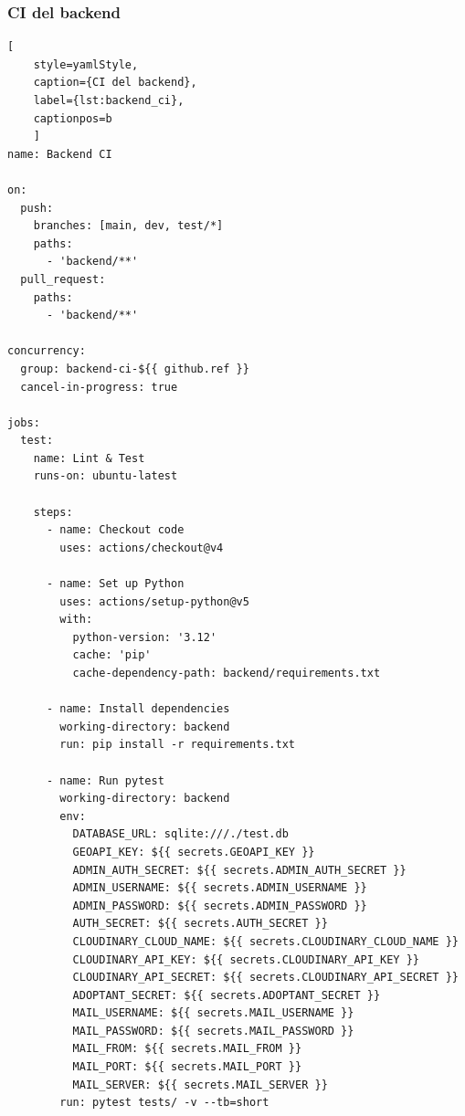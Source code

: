\documentclass[11pt,a4paper]{report}
\begin{document}
\subsubsection{CI del backend}
\begin{lstlisting}[
    style=yamlStyle,
    caption={CI del backend},
    label={lst:backend_ci},
    captionpos=b
    ]
name: Backend CI

on:
  push:
    branches: [main, dev, test/*]
    paths:
      - 'backend/**'
  pull_request:
    paths:
      - 'backend/**'

concurrency:
  group: backend-ci-${{ github.ref }}
  cancel-in-progress: true

jobs:
  test:
    name: Lint & Test
    runs-on: ubuntu-latest

    steps:
      - name: Checkout code
        uses: actions/checkout@v4

      - name: Set up Python
        uses: actions/setup-python@v5
        with:
          python-version: '3.12'
          cache: 'pip'
          cache-dependency-path: backend/requirements.txt

      - name: Install dependencies
        working-directory: backend
        run: pip install -r requirements.txt

      - name: Run pytest
        working-directory: backend
        env:
          DATABASE_URL: sqlite:///./test.db      
          GEOAPI_KEY: ${{ secrets.GEOAPI_KEY }}
          ADMIN_AUTH_SECRET: ${{ secrets.ADMIN_AUTH_SECRET }}
          ADMIN_USERNAME: ${{ secrets.ADMIN_USERNAME }}
          ADMIN_PASSWORD: ${{ secrets.ADMIN_PASSWORD }}
          AUTH_SECRET: ${{ secrets.AUTH_SECRET }}
          CLOUDINARY_CLOUD_NAME: ${{ secrets.CLOUDINARY_CLOUD_NAME }}
          CLOUDINARY_API_KEY: ${{ secrets.CLOUDINARY_API_KEY }}
          CLOUDINARY_API_SECRET: ${{ secrets.CLOUDINARY_API_SECRET }}
          ADOPTANT_SECRET: ${{ secrets.ADOPTANT_SECRET }}
          MAIL_USERNAME: ${{ secrets.MAIL_USERNAME }}
          MAIL_PASSWORD: ${{ secrets.MAIL_PASSWORD }}
          MAIL_FROM: ${{ secrets.MAIL_FROM }}
          MAIL_PORT: ${{ secrets.MAIL_PORT }}
          MAIL_SERVER: ${{ secrets.MAIL_SERVER }}
        run: pytest tests/ -v --tb=short
\end{lstlisting}
\end{document}
